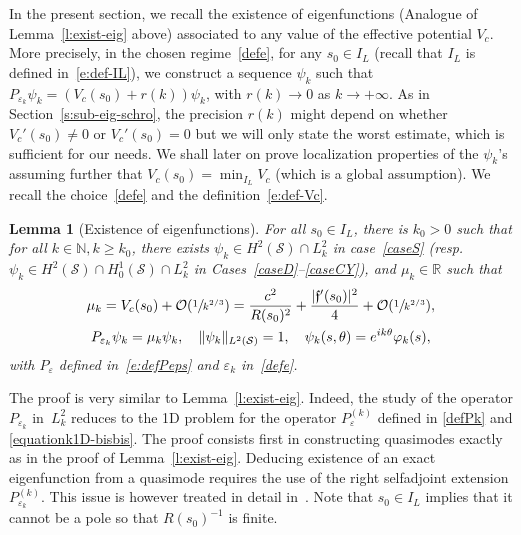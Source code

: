 \documentclass[11pt]{article}
\newcommand{\resp}{resp.\xspace}
\numberwithin{equation}{section}
\newtheorem{lemma}{Lemma}[section]
\theoremstyle{definition}
\newcommand{\calS}{\ensuremath{\mathcal S}}
\newcommand\grandon[1]{\mathcal{O}(#1)}
\newcommand{\mb}[1]{\ensuremath{\mathbb{#1}}}
\newcommand{\N}{{\mb{N}}}
\newcommand{\R}{{\mb{R}}}
\newcommand{\f}{\ensuremath{\mathfrak{f}}}
\newcommand{\ce}{c}
\let\e\varepsilon
\let\eps\varepsilon
\begin{document}
In the present section, we recall the existence of eigenfunctions (Analogue of Lemma~\ref{l:exist-eig} above) associated to any value of the effective potential $V_\ce$. More precisely, in the chosen regime~\eqref{defe}, for any $s_0\in I_L$ (recall that $I_L$ is defined in~\eqref{e:def-IL}), we construct a sequence $\psi_k$ such that $P_{\e_k} \psi_k = (V_\ce(s_0) + r(k)) \psi_k$, with $r(k)\to 0$ as $k\to + \infty$. As in Section~\ref{s:sub-eig-schro}, the precision $r(k)$ might depend on whether $V_\ce'(s_0) \neq 0$ or $V_\ce'(s_0) = 0$ but we will only state the worst estimate, which is sufficient for our needs. We shall later on prove localization properties of the $\psi_k$'s assuming further that $V_c(s_0) = \min_{I_L}V_\ce$ (which is a global assumption).
We recall the choice~\eqref{defe} and the definition~\eqref{e:def-Vc}.

\begin{lemma}[Existence of eigenfunctions]
\label{l:exist-mu-psibord}
For all $s_0 \in I_L$, there is $k_0>0$ such that for all $k\in\N, k\geq k_0$, there exists $\psi_k \in H^{2}(\calS)\cap L^2_k$ in case~\ref{caseS} (\resp $\psi_k \in H^{2}(\calS)\cap H^1_0(\calS)\cap L^2_k$ in Cases~\ref{caseD}--\ref{caseCY}), and $\mu_k \in \R$ such that
\begin{gather*}
\mu_k= V_\ce(s_0) +\grandon{\sfrac{1}{k^{2/3}}}
= \frac{\ce^2}{R(s_0)^2}+\frac{|\f'(s_0)|^2}{4} + \grandon{\sfrac{1}{k^{2/3}}}, \\
P_{\e_k} \psi_k = \mu_k \psi_k, \quad \|\psi_k\|_{L^2(\calS)}=1, \quad \psi_k(s,\theta) = e^{ik\theta} \varphi_k(s),
\end{gather*}
with $P_\eps$ defined in~\eqref{e:defPeps} and $\e_k$ in~\eqref{defe}.
\end{lemma}
The proof is very similar to Lemma~\ref{l:exist-eig}. Indeed, the study of the operator $P_{\e_k}$ in~$L^{2}_{k}$ reduces to the 1D problem for the operator $P_{\e}^{(k)}$ defined in \eqref{defPk} and \eqref{equationk1D-bisbis}. The proof consists first in constructing quasimodes exactly as in the proof of Lemma~\ref{l:exist-eig}. Deducing existence of an exact eigenfunction from a quasimode requires the use of the right selfadjoint extension $P_{\e_{k}}^{(k)}$. This issue is however treated in detail in~\cite[Lem.\,3.6]{LL:18}.
Note that $s_{0} \in I_L$ implies that it cannot be a pole so that $R(s_{0})^{-1}$ is finite.
\end{document}
